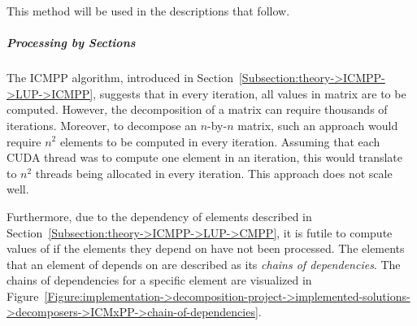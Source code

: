 This method will be used in the descriptions that follow.

\subparagraph{Processing by Sections}\label{Subparagrah:implementation->decomposition-project->implemented-solutions->decomposers->ICMxPP->processing-by-sections}
The ICMPP algorithm, introduced in Section~\ref{Subsection:theory->ICMPP->LUP->ICMPP}, suggests that in every iteration, all values in matrix  are to be computed.
However, the decomposition of a matrix can require thousands of iterations.
Moreover, to decompose an $n$-by-$n$ matrix, such an approach would require $n^2$ elements to be computed in every iteration.
Assuming that each CUDA thread was to compute one element in an iteration, this would translate to $n^2$ threads being allocated in every iteration.
This approach does not scale well.

Furthermore, due to the dependency of elements described in Section~\ref{Subsection:theory->ICMPP->LUP->CMPP}, it is futile to compute values of  if the elements they depend on have not been processed.
The elements that an element of  depends on are described as its \textit{chains of dependencies}.
The chains of dependencies for a specific element are visualized in Figure~\ref{Figure:implementation->decomposition-project->implemented-solutions->decomposers->ICMxPP->chain-of-dependencies}.

